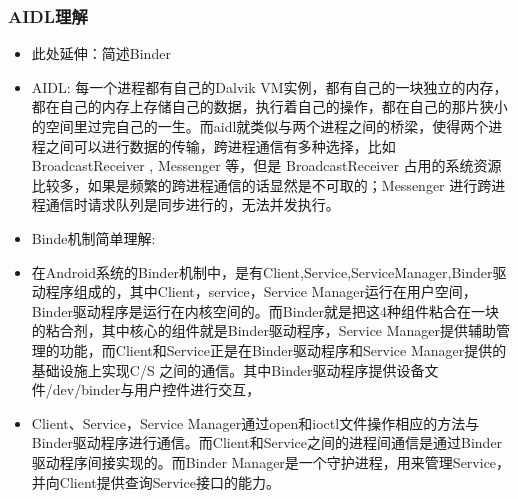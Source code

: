 \documentclass[9pt, b5paper]{article}
\begin{document}
\subsubsection{AIDL理解}
\label{sec-3-2-3}
\begin{itemize}
\item 此处延伸：简述Binder
\item AIDL: 每一个进程都有自己的Dalvik VM实例，都有自己的一块独立的内存，都在自己的内存上存储自己的数据，执行着自己的操作，都在自己的那片狭小的空间里过完自己的一生。而aidl就类似与两个进程之间的桥梁，使得两个进程之间可以进行数据的传输，跨进程通信有多种选择，比如 BroadcastReceiver , Messenger 等，但是 BroadcastReceiver 占用的系统资源比较多，如果是频繁的跨进程通信的话显然是不可取的；Messenger 进行跨进程通信时请求队列是同步进行的，无法并发执行。
\item Binde机制简单理解:
\item 在Android系统的Binder机制中，是有Client,Service,ServiceManager,Binder驱动程序组成的，其中Client，service，Service Manager运行在用户空间，Binder驱动程序是运行在内核空间的。而Binder就是把这4种组件粘合在一块的粘合剂，其中核心的组件就是Binder驱动程序，Service Manager提供辅助管理的功能，而Client和Service正是在Binder驱动程序和Service Manager提供的基础设施上实现C/S 之间的通信。其中Binder驱动程序提供设备文件/dev/binder与用户控件进行交互，
\item Client、Service，Service Manager通过open和ioctl文件操作相应的方法与Binder驱动程序进行通信。而Client和Service之间的进程间通信是通过Binder驱动程序间接实现的。而Binder Manager是一个守护进程，用来管理Service，并向Client提供查询Service接口的能力。
\end{itemize}
\end{document}
